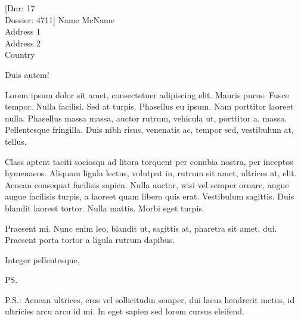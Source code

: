 \documentclass{scilife-letter}
\begin{document}
\begin{letter}[Dnr: 17\\Dossier: 4711]
              {Name McName\\
               Address 1\\
               Address 2\\
               Country}
\opening{Duis autem!}

Lorem ipsum dolor sit amet, consectetuer adipiscing elit. Mauris
purus. Fusce tempor. Nulla facilisi. Sed at turpis. Phasellus eu
ipsum. Nam porttitor laoreet nulla. Phasellus massa massa, auctor
rutrum, vehicula ut, porttitor a, massa. Pellentesque fringilla. Duis
nibh risus, venenatis ac, tempor sed, vestibulum at, tellus.

Class aptent taciti sociosqu ad litora torquent per conubia nostra,
per inceptos hymenaeos. Aliquam ligula lectus, volutpat in, rutrum sit
amet, ultrices at, elit. Aenean consequat facilisis sapien. Nulla
auctor, wisi vel semper ornare, augue augue facilisis turpis, a
laoreet quam libero quis erat. Vestibulum sagittis. Duis blandit
laoreet tortor. Nulla mattis. Morbi eget turpis.

Praesent mi. Nunc enim leo, blandit ut, sagittis at, pharetra sit
amet, dui. Praesent porta tortor a ligula rutrum dapibus.

\closing{Integer pellentesque,}
\ps

P.S.:
Aenean ultrices, eros vel sollicitudin semper, dui lacus hendrerit
metus, id ultricies arcu arcu id mi. In eget sapien sed lorem cursus
eleifend.

\end{letter}
\end{document}

